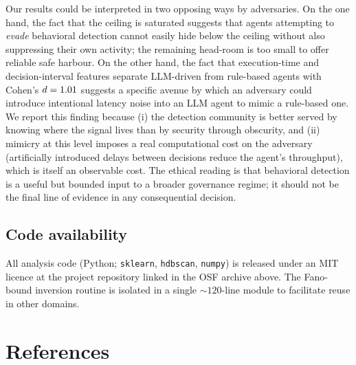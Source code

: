 \documentclass[11pt,a4paper]{article}
\begin{document}
Our results could be interpreted in two opposing ways by adversaries.
On the one hand, the fact that the ceiling is saturated suggests that
agents attempting to \emph{evade} behavioral detection cannot easily
hide below the ceiling without also suppressing their own activity; the
remaining head-room is too small to offer reliable safe harbour. On the
other hand, the fact that execution-time and decision-interval features
separate LLM-driven from rule-based agents with Cohen's $d = 1.01$
suggests a specific avenue by which an adversary could introduce
intentional latency noise into an LLM agent to mimic a rule-based one.
We report this finding because (i) the detection community is better
served by knowing where the signal lives than by security through
obscurity, and (ii) mimicry at this level imposes a real computational
cost on the adversary (artificially introduced delays between decisions
reduce the agent's throughput), which is itself an observable cost.
The ethical reading is that behavioral detection is a useful but
bounded input to a broader governance regime; it should not be the
final line of evidence in any consequential decision.

\subsection*{Code availability}

All analysis code (Python; \texttt{sklearn}, \texttt{hdbscan},
\texttt{numpy}) is released under an MIT licence at the project
repository linked in the OSF archive above. The Fano-bound inversion
routine is isolated in a single $\sim$$120$-line module to facilitate
reuse in other domains.

\section*{References}



\end{document}
